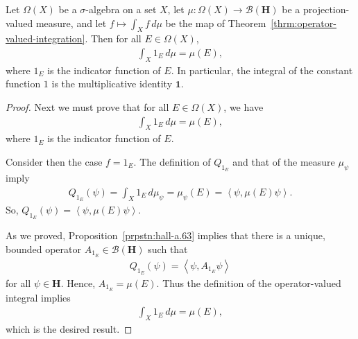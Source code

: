\begin{proposition}
    \label{prpstn:integral-of-indicator}
    \leanok
    Let $\Omega(X)$ be a $\sigma$-algebra on a set $X$, let $\mu : \Omega(X) \rightarrow \mathcal{B}(\mathbf{H})$ be a projection-valued measure, and let $f \mapsto \int_X f \, d\mu$ be the map of Theorem~\ref{thrm:operator-valued-integration}. Then for all $E \in \Omega(X)$,
    \begin{align}
        \int_X 1_E \, d\mu = \mu(E),
    \end{align}
    where $1_E$ is the indicator function of $E$. In particular, the integral of the constant function $1$ is the multiplicative identity $\mathbf{1}$.
\end{proposition}
\begin{proof}
    \leanok
Next we must prove that for all $E \in \Omega(X)$, we have
\begin{align}
    \int_X 1_E \, d\mu = \mu(E),
\end{align}
where $1_E$ is the indicator function of $E$.

Consider then the case $f = 1_E$. The definition of $Q_{1_E}$ and that of the measure $\mu_\psi$ imply
\begin{align}
    Q_{1_E}(\psi) = \int_X 1_E \, d\mu_\psi = \mu_\psi(E) = \left< \psi, \mu(E) \psi \right>.
\end{align}
So, $Q_{1_E}(\psi) = \left< \psi, \mu(E) \psi \right>$.

As we proved, Proposition~\ref{prpstn:hall-a.63} implies that there is a unique, bounded operator $A_{1_E} \in \mathcal{B}(\mathbf{H})$ such that
\begin{align}
    Q_{1_E}(\psi) = \left< \psi, A_{1_E}\psi \right>
\end{align}
for all $\psi \in \mathbf{H}$. Hence, $A_{1_E} = \mu(E)$. Thus the definition of the operator-valued integral implies
\begin{align}
    \int_X 1_E \, d\mu = \mu(E),
\end{align}
which is the desired result.
\end{proof}

